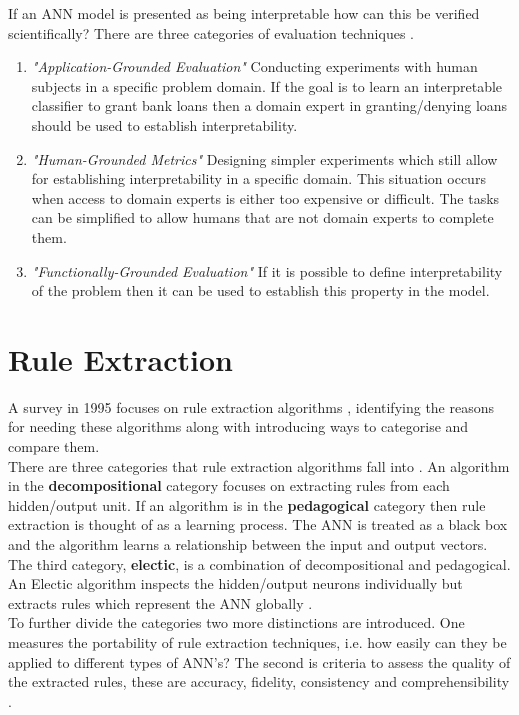 If an ANN model is presented as being interpretable how can this be verified scientifically? There are three categories of evaluation techniques \cite{doshi2017towards}.
\begin{enumerate}
	\item \textit{"Application-Grounded Evaluation"} Conducting experiments with human subjects in a specific problem domain. If the goal is to learn an interpretable classifier to grant bank loans then a domain expert in granting/denying loans should be used to establish interpretability.
	
	\item \textit{"Human-Grounded Metrics"} Designing simpler experiments which still allow for establishing interpretability in a specific domain. This situation occurs when access to domain experts is either too expensive or difficult. The tasks can be simplified to allow humans that are not domain experts to complete them.
	
	\item \textit{"Functionally-Grounded Evaluation"} If it is possible to define interpretability of the problem then it can be used to establish this property in the model.
\end{enumerate}


\section{Rule Extraction}

A survey in 1995 focuses on rule extraction algorithms \cite{andrews1995survey}, identifying the reasons for needing these algorithms along with introducing ways to categorise and compare them.\\

There are three categories that rule extraction algorithms fall into \cite{andrews1995survey}. An algorithm in the \textbf{decompositional} category focuses on extracting rules from each hidden/output unit. If an algorithm is in the \textbf{pedagogical} category then rule extraction is thought of as a learning process. The ANN is treated as a black box and the algorithm learns a relationship between the input and output vectors. The third category, \textbf{electic}, is a combination of decompositional and pedagogical. An Electic algorithm inspects the hidden/output neurons individually but extracts rules which represent the ANN globally \cite{tickle1998truth}.\\

To further divide the categories two more distinctions are introduced. One measures the portability of rule extraction techniques, i.e. how easily can they be applied to different types of ANN's? The second is criteria to assess the quality of the extracted rules, these are accuracy, fidelity, consistency and comprehensibility \cite{andrews1995survey}.

